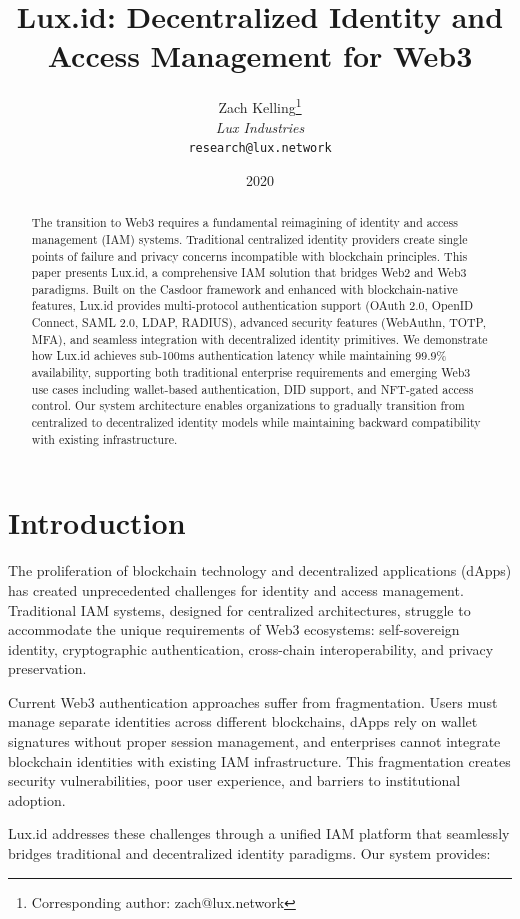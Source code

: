 \documentclass[11pt,a4paper]{article}
\title{Lux.id: Decentralized Identity and Access Management for Web3}
\author{
Zach Kelling\thanks{Corresponding author: zach@lux.network}\\
\textit{Lux Industries}\\
\texttt{research@lux.network}
}
\date{2020}
\begin{document}
\luxcoverpage
\maketitle

\begin{abstract}
The transition to Web3 requires a fundamental reimagining of identity and access management (IAM) systems. Traditional centralized identity providers create single points of failure and privacy concerns incompatible with blockchain principles. This paper presents Lux.id, a comprehensive IAM solution that bridges Web2 and Web3 paradigms. Built on the Casdoor framework and enhanced with blockchain-native features, Lux.id provides multi-protocol authentication support (OAuth 2.0, OpenID Connect, SAML 2.0, LDAP, RADIUS), advanced security features (WebAuthn, TOTP, MFA), and seamless integration with decentralized identity primitives. We demonstrate how Lux.id achieves sub-100ms authentication latency while maintaining 99.9\% availability, supporting both traditional enterprise requirements and emerging Web3 use cases including wallet-based authentication, DID support, and NFT-gated access control. Our system architecture enables organizations to gradually transition from centralized to decentralized identity models while maintaining backward compatibility with existing infrastructure.
\end{abstract}

\section{Introduction}

The proliferation of blockchain technology and decentralized applications (dApps) has created unprecedented challenges for identity and access management. Traditional IAM systems, designed for centralized architectures, struggle to accommodate the unique requirements of Web3 ecosystems: self-sovereign identity, cryptographic authentication, cross-chain interoperability, and privacy preservation.

Current Web3 authentication approaches suffer from fragmentation. Users must manage separate identities across different blockchains, dApps rely on wallet signatures without proper session management, and enterprises cannot integrate blockchain identities with existing IAM infrastructure. This fragmentation creates security vulnerabilities, poor user experience, and barriers to institutional adoption.

Lux.id addresses these challenges through a unified IAM platform that seamlessly bridges traditional and decentralized identity paradigms. Our system provides:
\end{document}

